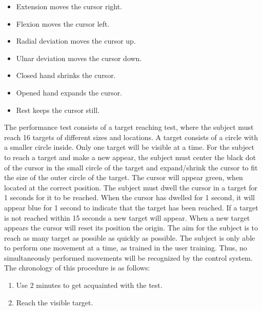 \begin{itemize}
	\item Extension moves the cursor right.
	\item Flexion moves the cursor left.
	\item Radial deviation moves the cursor up.
	\item Ulnar deviation moves the cursor down.
	\item Closed hand shrinks the cursor.
	\item Opened hand expands the cursor.
	\item Rest keeps the cursor still.
\end{itemize}

 The performance test consists of a target reaching test, where the subject must reach 16 targets of different sizes and locations. A target consists of a circle with a smaller circle inside. Only one target will be visible at a time. For the subject to reach a target and make a new appear, the subject must center the black dot of the cursor in the small circle of the target and expand/shrink the cursor to fit the size of the outer circle of the target. The cursor will appear green, when located at the correct position. The subject must dwell the cursor in a target for 1 seconds for it to be reached. When the cursor has dwelled for 1 second, it will appear blue for 1 second to indicate that the target has been reached. If a target is not reached within 15 seconds a new target will appear. When a new target appears the cursor will reset its position the origin. The aim for the subject is to reach as many target as possible as quickly as possible. The subject is only able to perform one movement at a time, as trained in the user training. Thus, no simultaneously performed movements will be recognized by the control system. %
 The chronology of this procedure is as follows:

\begin{enumerate}
	\item Use 2 minutes to get acquainted with the test. 
	\item Reach the visible target.
\end{enumerate}


